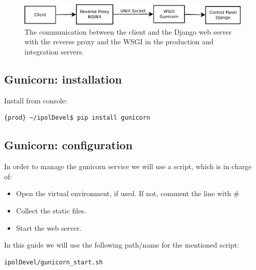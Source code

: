 \documentclass[a4paper,12pt]{article}
\begin{document}
\begin{figure}[!ht]
    \centering
    \includegraphics[width=1\columnwidth]{images/prod_int}
    \caption{The communication between the client and the Django web server with the reverse proxy and the WSGI in the production and integration servers.}
    \label{fig:prod_int_architecture}
\end{figure}


\subsection{Gunicorn: installation}

Install from console:
\begin{lstlisting}[language=Bash]
{prod} ~/ipolDevel$ pip install gunicorn
\end{lstlisting}

\subsection{Gunicorn: configuration}
In order to manage the gunicorn service we will use a script, which is in charge of:
\begin{itemize}
    \item Open the virtual environment, if used. If not, comment the line with \#
    \item Collect the static files.
    \item Start the web server.
\end{itemize}

In this guide we will use the following path/name for the mentioned script:
\begin{lstlisting}[language=Bash]
ipolDevel/gunicorn_start.sh
\end{lstlisting}
\end{document}
